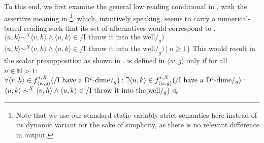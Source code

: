 To this end, we first examine the general low reading conditional in , with the assertive meaning in \footnote{Note that we use our standard static variably-strict semantics here instead of its dynamic variant for the sake of simplicity, as there is no relevant difference in output.}, which, intuitively speaking, seems to carry a numerical-based reading such that its set of alternatives would correspond to .
\pex[nopreamble=true]%
\a{} {}\\\linebreak\emptyfill$\langle u,k\rangle\sim^X\langle v,h\rangle\land\langle u,k\rangle\in/\text{I throw it into the well}/_g)$
\a{} {}\\\linebreak\emptyfill$\langle u,k\rangle\sim^X\langle v,h\rangle\land\langle u,k\rangle\in/\text{I throw it into the well}/_g)~|~n\geqslant1\}$
\xe
This would result in the scalar presupposition as shown in .
\ex{}
{}\linebreak
is defined in $\langle w,g\rangle$ only if for all $n\in\mathbb{N}>1$:\\
$\forall{\langle v,h\rangle\in f^{*,X}_{\langle w,g\rangle}(/\text{I have a D\textsuperscript{c}-dime}/_g)}:\exists\langle u,k\rangle\in f^{*,X}_{\langle w,g\rangle}(/\text{I have a D\textsuperscript{c}-dime}/_g):$\linebreak\emptyfill$\langle u,k\rangle\sim^X\langle v,h\rangle\land\langle u,k\rangle\in/\text{I throw it into the well}/_g)~\triangleleft_c$\\
